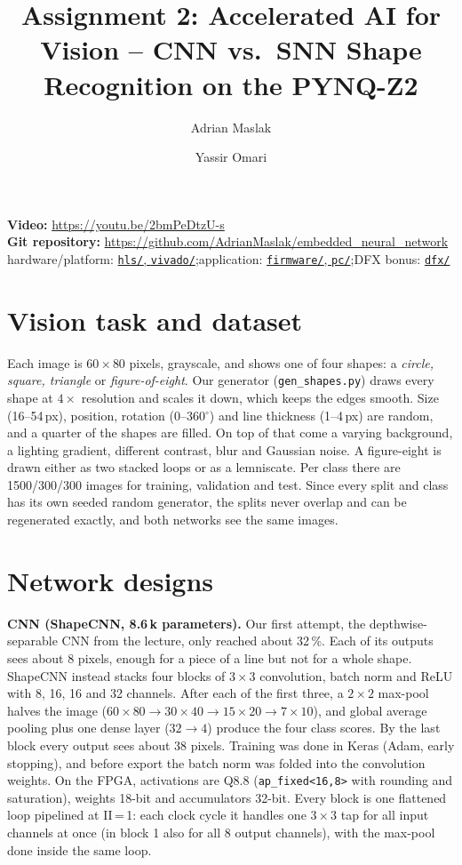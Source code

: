 \documentclass[10pt,a4paper]{article}
\title{\vspace{-1.2cm}Assignment 2: Accelerated AI for Vision -- CNN vs.\ SNN Shape Recognition on the PYNQ-Z2}
\author{Adrian Maslak \and Yassir Omari}
\date{\vspace{-0.6cm}}
\newcommand{\videolink}{\url{https://youtu.be/2bmPeDtzU-s}}
\newcommand{\gitRepo}{https://github.com/AdrianMaslak/embedded_neural_network}
\newcommand{\gitHW}{\href{\gitRepo/tree/main/vivado}{\texttt{hls/}, \texttt{vivado/}}}
\newcommand{\gitSW}{\href{\gitRepo/tree/main/firmware}{\texttt{firmware/}, \texttt{pc/}}}
\begin{document}
\maketitle
\vspace{-0.4cm}
\noindent\textbf{Video:} \videolink\\
\textbf{Git repository:} \url{\gitRepo}\quad
hardware/platform: \gitHW;\quad application: \gitSW;\quad DFX bonus: \href{\gitRepo/tree/main/dfx}{\texttt{dfx/}}

\section{Vision task and dataset}
Each image is $60\times80$ pixels, grayscale, and shows one of four shapes: a
\emph{circle, square, triangle} or \emph{figure-of-eight}. Our generator
(\texttt{gen\_shapes.py}) draws every shape at $4\times$ resolution and scales it down, which
keeps the edges smooth. Size (16--54\,px), position, rotation (0--360$^\circ$) and line
thickness (1--4\,px) are random, and a quarter of the shapes are filled. On top of that come a
varying background, a lighting gradient, different contrast, blur and Gaussian noise. A
figure-eight is drawn either as two stacked loops or as a lemniscate. Per class there are
1500/300/300 images for training, validation and test. Since every split and class has its own
seeded random generator, the splits never overlap and can be regenerated exactly, and both
networks see the same images.

\section{Network designs}
\textbf{CNN (ShapeCNN, 8.6\,k parameters).} Our first attempt, the depthwise-separable CNN
from the lecture, only reached about 32\,\%. Each of its outputs sees about 8 pixels, enough
for a piece of a line but not for a whole shape. ShapeCNN instead stacks four blocks of
$3\times3$ convolution, batch norm and ReLU with 8, 16, 16 and 32 channels. After each of the
first three, a $2\times2$ max-pool halves the image
($60{\times}80\to30{\times}40\to15{\times}20\to7{\times}10$), and global average pooling plus
one dense layer ($32\to4$) produce the four class scores. By the last block every output sees
about 38 pixels. Training was done in Keras (Adam, early stopping), and before export the batch
norm was folded into the convolution weights. On the FPGA, activations are Q8.8
(\texttt{ap\_fixed<16,8>} with rounding and saturation), weights 18-bit and accumulators
32-bit. Every block is one flattened loop pipelined at II\,=\,1: each clock cycle it handles
one $3\times3$ tap for all input channels at once (in block 1 also for all 8 output channels),
with the max-pool done inside the same loop.
\end{document}
